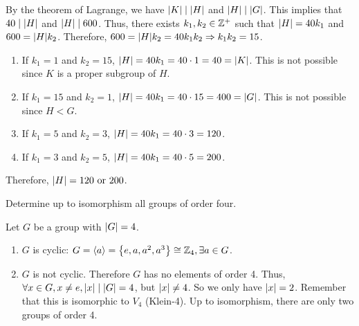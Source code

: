 \begin{solution}
    By the theorem of Lagrange, we have $\qty|K| \mid \qty|H|$ and $\qty|H| \mid \qty|G|$. This implies that $40 \mid \qty|H|$ and $\qty|H| \mid 600$. Thus, there exists $k_1, k_2 \in \mathbb{Z}^+$ such that $\qty|H| = 40k_1$ and $600 = \qty|H|k_2$. Therefore, $600 = \qty|H|k_2 = 40k_1k_2 \Rightarrow k_1k_2 = 15$.
    
    \begin{myspace}
        \begin{enumerate}[label=\textbf{Case \arabic*:}]
            \item If $k_1 = 1$ and $k_2 = 15$, $\qty|H| = 40 k_1 = 40 \cdot 1 = 40 = \qty|K|$. This is not possible since $K$ is a proper subgroup of $H$.
            \item If $k_1 = 15$ and $k_2 = 1$, $\qty|H| = 40k_1 = 40 \cdot 15 = 400 = \qty|G|$. This is not possible since $H < G$. 
            \item If $k_1 = 5$ and $k_2 = 3$, $\qty|H| = 40k_1 = 40 \cdot 3 = 120$.
            \item If $k_1 = 3$ and $k_2 = 5$, $\qty|H| = 40k_1 = 40 \cdot 5 = 200$.
        \end{enumerate}
    \end{myspace}
    Therefore, $\qty|H| = 120 \text{ or } 200$. 
\end{solution}

\begin{exercise}
    Determine up to isomorphism all groups of order four.
\end{exercise}

\begin{solution}
    Let $G$ be a group with $\qty|G| = 4$.
    \begin{myspace}
        \begin{enumerate}[label=\textbf{Case \arabic*:}]
            \item $G$ is cyclic: $G = \langle a \rangle = \qty{e, a, a^2, a^3} \cong \mathbb{Z}_4, \exists a \in G$.
            \item $G$ is not cyclic. Therefore $G$ has no elements of order 4. Thus, $\forall x \in G, x \neq e, \qty|x| \mid \qty|G| = 4$, but $\qty|x| \neq 4$. So we only have $\qty|x| = 2$. Remember that this is isomorphic to $V_4$ (Klein-4). Up to isomorphism, there are only two groups of order 4. 
        \end{enumerate}
    \end{myspace}
\end{solution}

